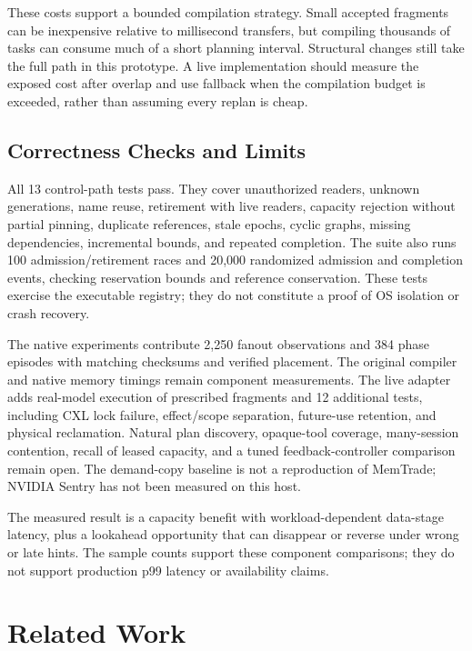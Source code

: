 \documentclass[letterpaper,twocolumn,10pt]{article}
\begin{document}
These costs support a bounded compilation strategy. Small accepted fragments
can be inexpensive relative to millisecond transfers, but compiling thousands
of tasks can consume much of a short planning interval. Structural changes
still take the full path in this prototype. A live implementation should
measure the exposed cost after overlap and use fallback when the compilation
budget is exceeded, rather than assuming every replan is cheap.



\subsection{Correctness Checks and Limits}

All 13 control-path tests pass. They cover unauthorized readers, unknown
generations, name reuse, retirement with live readers, capacity rejection
without partial pinning, duplicate references, stale epochs, cyclic graphs,
missing dependencies, incremental bounds, and repeated completion. The suite
also runs 100 admission/retirement races and 20,000 randomized admission and
completion events, checking reservation bounds and reference conservation.
These tests exercise the executable registry; they do not constitute a proof
of OS isolation or crash recovery.

The native experiments contribute 2,250 fanout observations and 384 phase
episodes with matching checksums and verified placement. The original
compiler and native memory timings remain component measurements.
The live adapter adds real-model execution of prescribed fragments and 12
additional tests, including CXL lock failure, effect/scope separation,
future-use retention, and physical reclamation. Natural plan discovery,
opaque-tool coverage, many-session contention, recall of leased capacity,
and a tuned feedback-controller comparison remain open. The demand-copy
baseline is not a reproduction of MemTrade; NVIDIA Sentry has not been
measured on this host.

The measured result is a capacity benefit with workload-dependent data-stage
latency, plus a lookahead opportunity that can disappear or reverse under
wrong or late hints. The sample counts support these component comparisons;
they do not support production p99 latency or availability claims.

\section{Related Work}
\label{sec:related}
\end{document}
